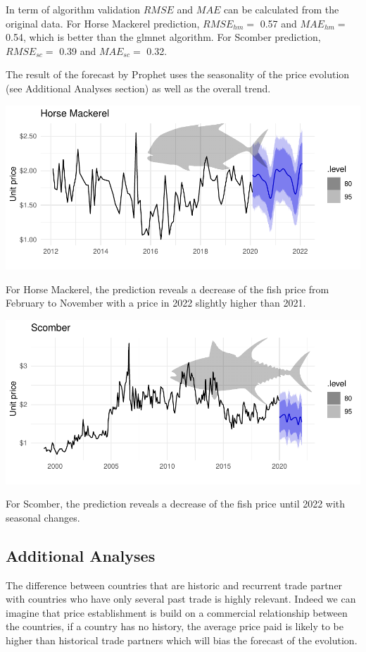 \documentclass[10,a4paperpaper,]{article}
\begin{document}
In term of algorithm validation \(RMSE\) and \(MAE\) can be calculated
from the original data. For Horse Mackerel prediction, \(RMSE_{hm} =\)
0.57 and \(MAE_{hm} =\) 0.54, which is better than the glmnet algorithm.
For Scomber prediction, \(RMSE_{sc} =\) 0.39 and \(MAE_{sc} =\) 0.32.

The result of the forecast by Prophet uses the seasonality of the price
evolution (see Additional Analyses section) as well as the overall
trend.

\includegraphics{report_files/figure-latex/unnamed-chunk-9-1.pdf}

For Horse Mackerel, the prediction reveals a decrease of the fish price
from February to November with a price in 2022 slightly higher than
2021.

\includegraphics{report_files/figure-latex/unnamed-chunk-10-1.pdf}

For Scomber, the prediction reveals a decrease of the fish price until
2022 with seasonal changes.

\subsection{Additional Analyses}

The difference between countries that are historic and recurrent trade
partner with countries who have only several past trade is highly
relevant. Indeed we can imagine that price establishment is build on a
commercial relationship between the countries, if a country has no
history, the average price paid is likely to be higher than historical
trade partners which will bias the forecast of the evolution.
\end{document}
